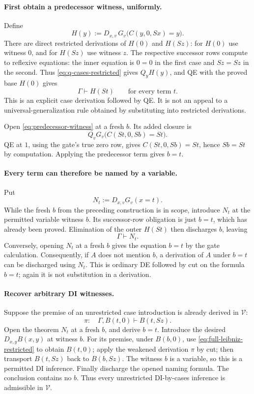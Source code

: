 \paragraph{First obtain a predecessor witness, uniformly.}
Define
\[
 H(y):=D_{x,v}\,G_v\bigl(C(y,0,Sx)=y\bigr).
\]
There are direct restricted derivations of $H(0)$ and $H(Sz)$:
for $H(0)$ use witness $0$, and for $H(Sz)$ use witness $z$.
The respective successor rows compute to reflexive equations: the inner
equation is $0=0$ in the first case and $Sz=Sz$ in the second.
Thus \eqref{eq:q-cases-restricted} gives $Q_yH(y)$, and QE with the proved
base $H(0)$ gives
\begin{equation}
 \Gamma\vdash H(St)\qquad\text{for every term }t.
 \tag{H}\label{eq:predecessor-witness}
\end{equation}
This is an explicit case derivation followed by QE. It is not an appeal to
a universal-generalization rule obtained by substituting into restricted
derivations.

Open \eqref{eq:predecessor-witness} at a fresh $b$. Its added closure is
\[
 Q_vG_v\bigl(C(St,0,Sb)=St\bigr).
\]
QE at $1$, using the gate's true zero row, gives
$C(St,0,Sb)=St$, hence $Sb=St$ by computation. Applying the predecessor
term gives $b=t$.

\paragraph{Every term can therefore be named by a variable.}
Put
\[
 N_t:=D_{x,v}G_v(x=t).
\]
While the fresh $b$ from the preceding construction is in scope, introduce
$N_t$ at the permitted variable witness $b$. Its successor-row obligation
is just $b=t$, which has already been proved. Elimination of the outer
$H(St)$ then discharges $b$, leaving
\begin{equation}
 \Gamma\vdash N_t.\tag{Name}\label{eq:term-naming-restricted}
\end{equation}
Conversely, opening $N_t$ at a fresh $b$ gives the equation $b=t$ by the
gate calculation. Consequently, if $A$ does not mention $b$, a derivation of
$A$ under $b=t$ can be discharged using $N_t$. This is ordinary DE followed
by cut on the formula $b=t$; again it is not substitution in a derivation.

\paragraph{Recover arbitrary DI witnesses.}
Suppose the premise of an unrestricted case introduction is already derived
in $\mathcal V$:
\[
 \pi:\quad\Gamma,B(t,0)\vdash B(t,Sz).
\]
Open the theorem $N_t$ at a fresh $b$, and derive $b=t$. Introduce the
desired $D_{x,y}B(x,y)$ at witness $b$. For its premise, under $B(b,0)$,
use \eqref{eq:full-leibniz-restricted} to obtain $B(t,0)$; apply the weakened
derivation $\pi$ by cut; then transport $B(t,Sz)$ back to $B(b,Sz)$.
The witness $b$ is a variable, so this is a permitted DI inference.
Finally discharge the opened naming formula. The conclusion contains no $b$.
Thus every unrestricted DI-by-cases inference is admissible in
$\mathcal V$.

